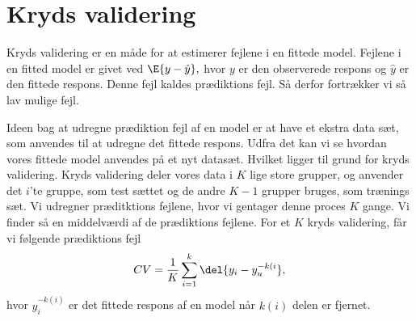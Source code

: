 \section{Kryds validering}
Kryds validering er en måde for at estimerer fejlene i en fittede model. Fejlene i en fitted model er givet ved $\E{y - \hat{y}},$ hvor $y$ er den observerede respons og  $\hat{y} $ er den fittede respons. Denne fejl kaldes prædiktions fejl. Så derfor fortrækker vi så lav mulige fejl. 

Ideen bag at udregne prædiktion fejl af en model er at have et ekstra data sæt, som anvendes til at udregne det fittede respons. Udfra det kan vi se hvordan vores fittede model anvendes på et nyt datasæt. %
Hvilket ligger til grund for kryds validering. Kryds validering deler vores data i $K$ lige store  grupper, og anvender det $i$'te gruppe, som test sættet og de andre $K-1$ grupper bruges, som trænings sæt. Vi udregner præditktions fejlene, hvor vi gentager denne proces $K$ gange. Vi finder så en middelværdi af de prædiktions fejlene. 
For et $K$ kryds validering, får vi følgende prædiktions fejl
\begin{align*}
CV = \frac{1}{K} \sum_{i =1}^k \del{y_i - y_u^{-k(i}},
\end{align*}
hvor $y_i^{-k(i)}$ er det fittede respons af en model når $k(i)$ delen er fjernet. 